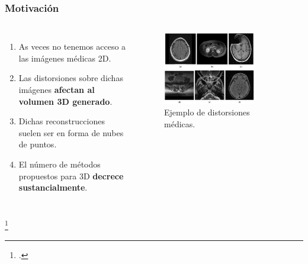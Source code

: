 \begin{frame}
  \frametitle{Motivación}
  \vspace{-0.2cm}
  \begin{columns}
  \begin{enumerate}
    \item As veces no tenemos acceso a las imágenes médicas 2D.
    \item Las distorsiones sobre dichas imágenes \textbf{afectan al volumen 3D generado}. 
    \item Dichas reconstrucciones suelen ser en forma de nubes de puntos.
    \item El número de métodos propuestos para 3D \textbf{decrece sustancialmente}.
  \end{enumerate}
  \begin{figure}
    \begin{center}
      \includegraphics[width=0.78\textwidth]{imagenes/chapter1/MedicalDistortions}
    \end{center}
    \caption{Ejemplo de distorsiones médicas\footnotemark.}
  \end{figure}
  \end{columns}
  \footcitetext{MoreMedicalDistortion}
\end{frame}

